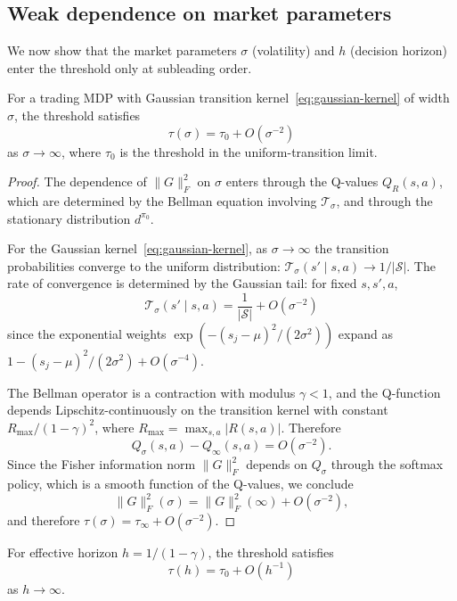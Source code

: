 \subsection{Weak dependence on market parameters}

We now show that the market parameters $\sigma$ (volatility) and $h$
(decision horizon) enter the threshold only at subleading order.

\begin{proposition}\label{prop:volatility}
For a trading MDP with Gaussian transition kernel~\eqref{eq:gaussian-kernel}
of width $\sigma$, the threshold satisfies
\begin{equation}\label{eq:vol-bound}
\tau(\sigma) = \tau_0 + O(\sigma^{-2})
\end{equation}
as $\sigma \to \infty$, where $\tau_0$ is the threshold in the
uniform-transition limit.
\end{proposition}

\begin{proof}
The dependence of $\lVert G \rVert_F^2$ on $\sigma$ enters through the
Q-values $Q_{R}(s,a)$, which are determined by the Bellman equation
involving $\mathcal{T}_\sigma$, and through the stationary distribution
$d^{\pi_0}$.

For the Gaussian kernel~\eqref{eq:gaussian-kernel}, as $\sigma \to \infty$
the transition probabilities converge to the uniform distribution:
$\mathcal{T}_\sigma(s' \mid s,a) \to 1/|\mathcal{S}|$. The rate of
convergence is determined by the Gaussian tail: for fixed $s, s', a$,
\[
\mathcal{T}_\sigma(s' \mid s, a) = \frac{1}{|\mathcal{S}|} + O(\sigma^{-2})
\]
since the exponential weights $\exp(-(s_j - \mu)^2/(2\sigma^2))$ expand as
$1 - (s_j - \mu)^2/(2\sigma^2) + O(\sigma^{-4})$.

The Bellman operator is a contraction with modulus $\gamma < 1$, and the
Q-function depends Lipschitz-continuously on the transition kernel with
constant $R_{\max}/(1-\gamma)^2$, where $R_{\max} = \max_{s,a} |R(s,a)|$.
Therefore
\[
Q_\sigma(s,a) - Q_\infty(s,a) = O(\sigma^{-2}).
\]
Since the Fisher information norm $\lVert G \rVert_F^2$ depends on
$Q_\sigma$ through the softmax policy, which is a smooth function of the
Q-values, we conclude
\[
\lVert G \rVert_F^2(\sigma) = \lVert G \rVert_F^2(\infty) + O(\sigma^{-2}),
\]
and therefore $\tau(\sigma) = \tau_\infty + O(\sigma^{-2})$.
\end{proof}

\begin{proposition}\label{prop:horizon}
For effective horizon $h = 1/(1-\gamma)$, the threshold satisfies
\begin{equation}\label{eq:horizon-bound}
\tau(h) = \tau_0 + O(h^{-1})
\end{equation}
as $h \to \infty$.
\end{proposition}

